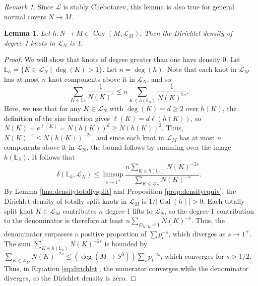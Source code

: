 \documentclass{amsart}
\theoremstyle{plain}
\theoremstyle{definition}
\theoremstyle{plain}
\theoremstyle{plain}
\theoremstyle{plain}
\newtheorem{lemma}[theorem]{Lemma}
\theoremstyle{remark}
\newtheorem{remark}[theorem]{Remark}
\theoremstyle{remark}
\theoremstyle{plain}
\theoremstyle{definition}
\theoremstyle{plain}
\DeclareMathOperator{\Gal}{\mathrm{Gal}}
\DeclareMathOperator{\Cov}{\mathrm{Cov}}
\theoremstyle{plain}
\theoremstyle{plain}
\numberwithin{equation}{section}
\begin{document}
\begin{remark}\label{rmk:stable}
Since $\mathcal{L}$ is stably Chebotarev, this lemma is also true for general normal covers $N \rightarrow M$. 
\end{remark}

\begin{lemma}\label{lma:density}
Let $h: N \to M \in \Cov(M, \mathcal{L}_M)$. Then the Dirichlet density of degree-1 knots in $\mathcal{L}_N$ is 1. 
\end{lemma}

\begin{proof}
We will show that knots of degree greater than one have density 0. Let $\mathbb{L}_h = \{K \in \mathcal{L}_N \mid \deg(K) > 1\}$. Let $n = \deg(h)$. Note that each knot in $\mathcal{L}_M$ has at most $n$ knot components above it in $\mathcal{L}_N$, and so
\begin{equation}
   \sum_{K \in \mathbb{L}_{h}}\frac{1}{N(K)^s} \leq n\sum_{K \in h(\mathbb{L}_{h})}\frac{1}{N(K)^{2s}}.
\end{equation}
Here, we use that for any $K \in \mathcal{L}_N$ with $\deg(K) = d \geq 2$ over $h(K)$, the definition of the size function gives $\ell(K) = d\ell(h(K))$, so $N(K) = e^{\ell(K)} = N(h(K))^d \geq N(h(K))^2$. Thus, $N(K)^{-s} \leq N(h(K))^{-2s}$, and since each knot in $\mathcal{L}_M$ has at most $n$ components above it in $\mathcal{L}_N$, the bound follows by summing over the image $h(\mathbb{L}_{h})$. It follows that 
\begin{equation}\label{eq:dirichlet}
     \delta(\mathbb{L}_{h}, \mathcal{L}_N) \leq \limsup_{s \rightarrow 1^+}\frac{n\sum_{K \in h(\mathbb{L}_{h})}N(K)^{-2s}}{\sum_{K \in \mathcal{L}_N}N(K)^{-s}}.
\end{equation}
By Lemma \ref{lma:densitytotallysplit} and Proposition \ref{prop:densityequiv}, the Dirichlet density of totally split knots in $\mathcal{L}_M$ is $1/|\Gal(h)| > 0$. Each totally split knot $K \in \mathcal{L}_M$ contributes $n$ degree-1 lifts to $\mathcal{L}_N$, so the degree-1 contribution to the denominator is therefore at least $n\sum_{D_{K'|K}=1}N(K)^{-s}$. Thus, the denominator surpasses a positive proportion of $\sum p_i^{-s}$, which diverges as $s \to 1^+$. The sum $\sum_{K \in h(\mathbb{L}_{h})}N(K)^{-2s}$ is bounded by $\sum_{K \in \mathcal{L}_M}N(K)^{-2s} \leq (\deg(M \to S^3))\sum_ip_i^{-2s}$, which converges for $s > 1/2$. Thus, in Equation \ref{eq:dirichlet}, the numerator converges while the denominator diverges, so the Dirichlet density is zero.
\end{proof}
\end{document}
